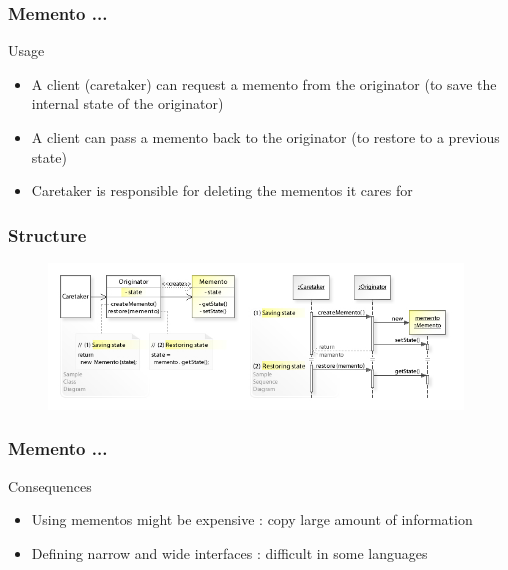 \documentclass{beamer}
\begin{document}
\begin{frame}[fragile]
\frametitle{Memento ...}

\begin{block}{Usage}
\begin{itemize}
\item A client (caretaker) can request a memento from the originator 
(to save the internal state of the originator)
\item A client can pass a memento back to the originator (to restore to a previous state)
\item Caretaker is responsible for deleting the mementos it cares for
\end{itemize}
\end{block}

\end{frame}


\begin{frame}[fragile]
\frametitle{Structure}

 \begin{figure}[ht]
       \includegraphics[width=11cm]{./images/memento.jpg}
 \end{figure}

\end{frame}

\begin{frame}[fragile]
\frametitle{Memento ...}

\begin{block}{Consequences}
    \begin{itemize}
    \item Using mementos might be expensive : copy large amount of information
    \item Defining narrow and wide interfaces : difficult in some languages 
    \end{itemize}
\end{block}

\end{frame}
\end{document}
